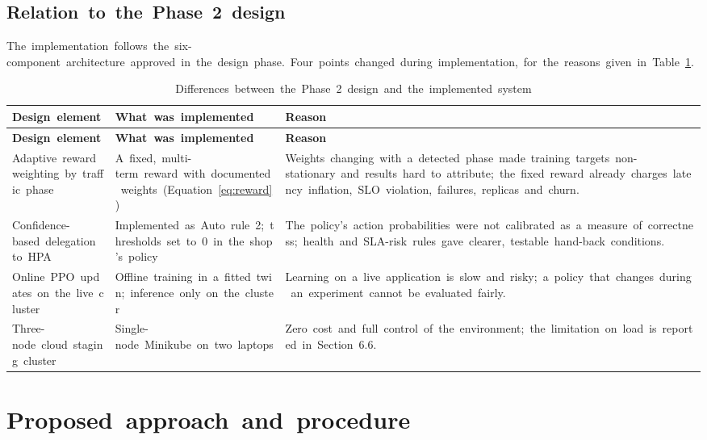 \documentclass[12pt,a4paper,oneside]{report}
\begin{document}
\subsection{Relation~to~the~Phase~2~design}

The~implementation~follows~the~six-component~architecture~approved~in~the~design~phase.~Four~points~changed~during~implementation,~for~the~reasons~given~in~Table~\ref{tab:deviations}.


\begingroup\small\setlength{\tabcolsep}{4pt}\renewcommand{\arraystretch}{1.25}
\begin{longtable}{|>{\raggedright\arraybackslash}p{3.49cm}|>{\raggedright\arraybackslash}p{4.65cm}|>{\raggedright\arraybackslash}p{6.40cm}|}
\caption{Differences~between~the~Phase~2~design~and~the~implemented~system}\label{tab:deviations}\\\hline
\textbf{Design~element} & \textbf{What~was~implemented} & \textbf{Reason}\\\hline\endfirsthead
\hline \textbf{Design~element} & \textbf{What~was~implemented} & \textbf{Reason}\\\hline\endhead
Adaptive~reward~weighting~by~traffic~phase & A~fixed,~multi-term~reward~with~documented~weights~(Equation~\ref{eq:reward}) & Weights~changing~with~a~detected~phase~made~training~targets~non-stationary~and~results~hard~to~attribute;~the~fixed~reward~already~charges~latency~inflation,~SLO~violation,~failures,~replicas~and~churn.\\\hline
Confidence-based~delegation~to~HPA & Implemented~as~Auto~rule~2;~thresholds~set~to~0~in~the~shop's~policy & The~policy's~action~probabilities~were~not~calibrated~as~a~measure~of~correctness;~health~and~SLA-risk~rules~gave~clearer,~testable~hand-back~conditions.\\\hline
Online~PPO~updates~on~the~live~cluster & Offline~training~in~a~fitted~twin;~inference~only~on~the~cluster & Learning~on~a~live~application~is~slow~and~risky;~a~policy~that~changes~during~an~experiment~cannot~be~evaluated~fairly.\\\hline
Three-node~cloud~staging~cluster & Single-node~Minikube~on~two~laptops & Zero~cost~and~full~control~of~the~environment;~the~limitation~on~load~is~reported~in~Section~6.6.\\\hline
\end{longtable}\endgroup

\section{Proposed~approach~and~procedure}
\end{document}
